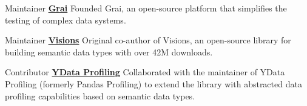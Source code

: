\begin{cventries}
  \cventry
    {Maintainer}   
    {\href{https://github.com/grai-io/grai-core}{\textbf{Grai}}}
    {}
    {}
    {Founded Grai, an open-source platform that simplifies the testing of complex data systems.}

  \vspace{.5em}
  
  \cventry
    {Maintainer}
    {\href{https://github.com/dylan-profiler/visions}{\textbf{Visions}}}
    {}
    {}
    {Original co-author of Visions, an open-source library for building semantic data types with over 42M downloads.}

  \vspace{.5em}

  \cventry
    {Contributor}
    {\href{https://docs.profiling.ydata.ai/latest/}{\textbf{YData Profiling}}}
    {}
    {}
    {Collaborated with the maintainer of YData Profiling (formerly Pandas Profiling) to extend the library with abstracted data profiling capabilities based on semantic data types.}
\end{cventries}

